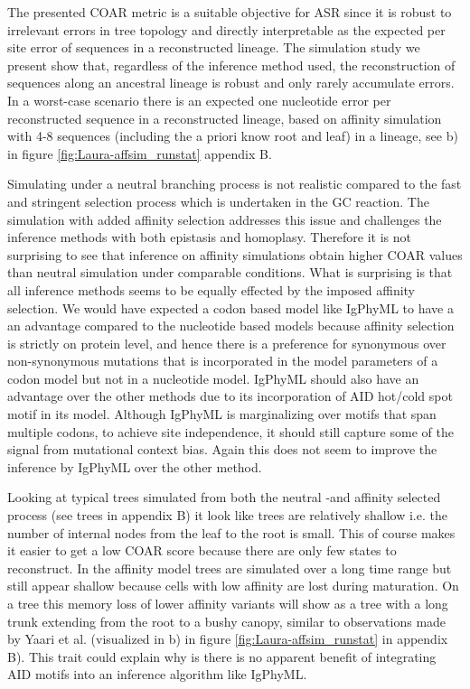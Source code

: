 The presented COAR metric is a suitable objective for ASR since it is robust to irrelevant errors in tree topology and directly interpretable as the expected per site error of sequences in a reconstructed lineage.
The simulation study we present show that, regardless of the inference method used, the reconstruction of sequences along an ancestral lineage is robust and only rarely accumulate errors.
In a worst-case scenario there is an expected one nucleotide error per reconstructed sequence in a reconstructed lineage, based on affinity simulation with 4-8 sequences (including the a priori know root and leaf) in a lineage, see b) in figure \ref{fig:Laura-affsim_runstat} appendix B.

Simulating under a neutral branching process is not realistic compared to the fast and stringent selection process which is undertaken in the GC reaction.
The simulation with added affinity selection addresses this issue and challenges the inference methods with both epistasis and homoplasy.
Therefore it is not surprising to see that inference on affinity simulations obtain higher COAR values than neutral simulation under comparable conditions.
What is surprising is that all inference methods seems to be equally effected by the imposed affinity selection.
We would have expected a codon based model like IgPhyML to have a an advantage compared to the nucleotide based models because affinity selection is strictly on protein level, and hence there is a preference for synonymous over non-synonymous mutations that is incorporated in the model parameters of a codon model but not in a nucleotide model.
IgPhyML should also have an advantage over the other methods due to its incorporation of AID hot/cold spot motif in its model.
Although IgPhyML is marginalizing over motifs that span multiple codons, to achieve site independence, it should still capture some of the signal from mutational context bias.
Again this does not seem to improve the inference by IgPhyML over the other method.

Looking at typical trees simulated from both the neutral -and affinity selected process (see trees in appendix B) it look like trees are relatively shallow i.e. the number of internal nodes from the leaf to the root is small.
This of course makes it easier to get a low COAR score because there are only few states to reconstruct.
In the affinity model trees are simulated over a long time range but still appear shallow because cells with low affinity are lost during maturation.
On a tree this memory loss of lower affinity variants will show as a tree with a long trunk extending from the root to a bushy canopy, similar to observations made by Yaari et al. \cite{yaari2015mutation} (visualized in b) in figure \ref{fig:Laura-affsim_runstat} in appendix B).
This trait could explain why is there is no apparent benefit of integrating AID motifs into an inference algorithm like IgPhyML.

